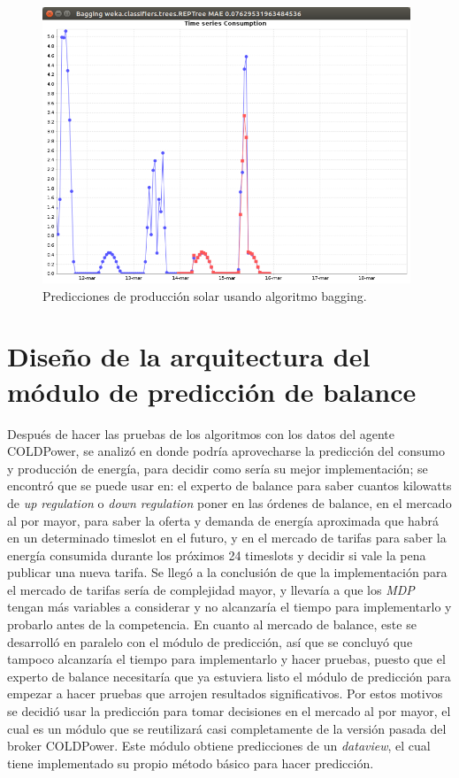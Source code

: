 \begin{figure}[h]
	\centering
	\includegraphics[width=11cm]{img/prediccionSolarBagging.png}
	\caption{Predicciones de producción solar usando algoritmo bagging.}
	\label{fig:prediccionSolarBagging}
\end{figure}

\clearpage
\section{Diseño de la arquitectura del módulo de predicción de balance} \label{sec:disArqu}

Después de hacer las pruebas de los algoritmos con los datos del agente COLDPower, se analizó en donde podría aprovecharse la predicción del consumo y producción de energía, para decidir como sería su mejor implementación; se encontró que se puede usar en: el experto de balance para saber cuantos kilowatts de \textit{up regulation} o \textit{down regulation} poner en las órdenes de balance, %
en el mercado al por mayor, para saber la oferta y demanda de energía aproximada que habrá en un determinado timeslot en el futuro, y en el mercado de tarifas para saber la energía consumida durante los próximos 24 timeslots y decidir si vale la pena publicar una nueva tarifa. 
Se llegó a la conclusión de que la implementación para el mercado de tarifas sería de complejidad mayor, y llevaría a que los \textit{MDP} tengan más variables a considerar y no alcanzaría el tiempo para implementarlo y probarlo antes de la competencia.
En cuanto al mercado de balance, este se desarrolló en paralelo con el módulo de predicción, así que se concluyó que tampoco alcanzaría el tiempo para implementarlo y hacer pruebas, puesto que el experto de balance necesitaría que ya estuviera listo el módulo de  predicción para empezar a hacer pruebas que arrojen resultados significativos.
Por estos motivos se decidió usar la predicción para tomar decisiones en el mercado al por mayor, el cual es un módulo que se reutilizará casi completamente de la versión pasada del broker COLDPower. Este módulo obtiene predicciones de un \textit{dataview}, el cual tiene implementado su propio método básico para hacer predicción.

